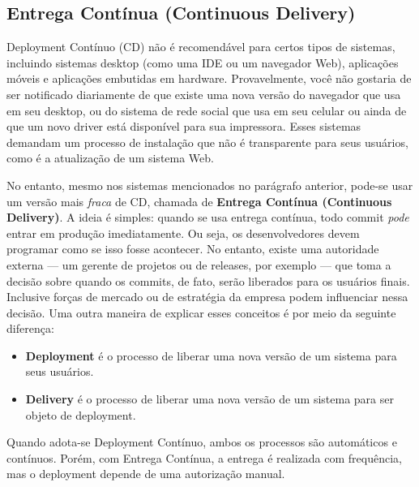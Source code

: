 \documentclass[
  11pt,
  twoside]{book}
\begin{document}
\hypertarget{entrega-contuxednua-continuous-delivery}{%
\subsection{Entrega Contínua (Continuous
Delivery)}\label{entrega-contuxednua-continuous-delivery}}

 

Deployment Contínuo (CD) não é recomendável para certos tipos de
sistemas, incluindo sistemas desktop (como uma IDE ou um navegador Web),
aplicações móveis e aplicações embutidas em hardware. Provavelmente,
você não gostaria de ser notificado diariamente de que existe uma nova
versão do navegador que usa em seu desktop, ou do sistema de rede social
que usa em seu celular ou ainda de que um novo driver está disponível
para sua impressora. Esses sistemas demandam um processo de instalação
que não é transparente para seus usuários, como é a atualização de um
sistema Web.

No entanto, mesmo nos sistemas mencionados no parágrafo anterior,
pode-se usar um versão mais \emph{fraca} de CD, chamada de
\textbf{Entrega Contínua (Continuous Delivery)}. A ideia é simples:
quando se usa entrega contínua, todo commit \emph{pode} entrar em
produção imediatamente. Ou seja, os desenvolvedores devem programar como
se isso fosse acontecer. No entanto, existe uma autoridade externa ---
um gerente de projetos ou de releases, por exemplo --- que toma a
decisão sobre quando os commits, de fato, serão liberados para os
usuários finais. Inclusive forças de mercado ou de estratégia da empresa
podem influenciar nessa decisão. Uma outra maneira de explicar esses
conceitos é por meio da seguinte diferença:

\begin{itemize}
\item
  \textbf{Deployment} é o processo de liberar uma nova versão de um
  sistema para seus usuários.
\item
  \textbf{Delivery} é o processo de liberar uma nova versão de um
  sistema para ser objeto de deployment.
\end{itemize}

Quando adota-se Deployment Contínuo, ambos os processos são automáticos
e contínuos. Porém, com Entrega Contínua, a entrega é realizada com
frequência, mas o deployment depende de uma autorização manual.

  
\end{document}
